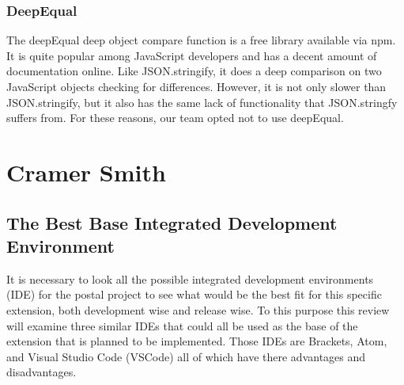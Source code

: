\documentclass[letterpaper,10pt,titlepage,draftclsnofoot,onecolumn,onesided] {IEEEtran}
\begin{document}
\subsubsection{DeepEqual}
The deepEqual deep object compare function is a free library available via npm. 
It is quite popular among JavaScript developers and has a decent amount of documentation online. 
Like JSON.stringify, it does a deep comparison on two JavaScript objects checking for differences.
However, it is not only slower than JSON.stringify, but it also has the same lack of functionality that JSON.stringfy suffers from. 
For these reasons, our team opted not to use deepEqual. \cite{deep}


\section{Cramer Smith}

\subsection{The Best Base Integrated Development Environment} 
It is necessary to look all the possible integrated development environments (IDE) for the postal project to see what would be the best fit for this specific extension, both development wise and release wise.
To this purpose this review will examine three similar IDEs that could all be used as the base of the extension that is planned to be implemented.
Those IDEs are Brackets, Atom, and Visual Studio Code (VSCode) all of which have there advantages and disadvantages.
\end{document}
